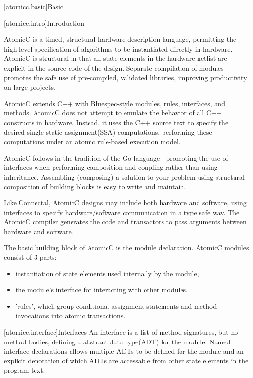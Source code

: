 [atomicc.basic]{Basic}

[atomicc.intro]{Introduction}

AtomicC is a timed, structural hardware description language, permitting
the high level specification of algorithms to be instantiated
directly in hardware.
AtomicC is structural in that all state elements in the hardware
netlist are explicit in the source code of the design.
Separate compilation of modules promotes the safe use of pre-compiled, validated
libraries, improving productivity on large projects.

AtomicC extends C++
with Bluespec-style\cite{Bluespec:www,Hoe:Thesis,HoeArvind:TRS_Synthesis2}
modules, rules, interfaces, and methods.
AtomicC does not attempt to emulate the behavior of all C++ constructs in hardware.
Instead, it uses the C++ source text to specify the desired
single static assignment(SSA) computations,
performing these computations under an atomic rule-based execution model.

AtomicC follows in the tradition of the Go language \cite{Pike2012},
promoting the use of interfaces when performing composition and
coupling rather than using inheritance.  Assembling (composing) a solution
to your problem using structural composition of building blocks
is easy to write and maintain.

Like Connectal, AtomicC designs may include both hardware and
software, using interfaces to specify hardware/software communication
in a type safe way. The AtomicC compiler generates the code and transactors to pass
arguments between hardware and software.

The basic building block of AtomicC is the module declaration.
AtomicC modules consist of 3 parts:
\begin{itemize}
\item instantiation of state elements used internally by the module,
\item the module's interface for interacting with other modules.
\item 'rules', which group conditional assignment statements and method invocations into atomic transactions.
\end{itemize}

[atomicc.interface]{Interfaces}
An interface is a list of method signatures, but no method bodies, defining
a abstract data type(ADT)\cite{Liskov74programmingwith} for the module.
Named interface declarations allows multiple ADTs to be defined for
the module and an explicit denotation of which ADTs are accessable from other
state elements in the program text.

